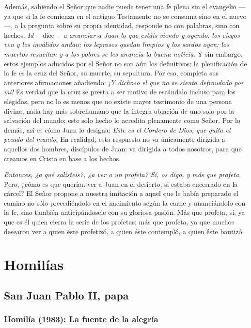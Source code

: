 Además, sabiendo el Señor que nadie puede tener una fe plena sin el evangelio ---ya que si la fe comienza en el antiguo Testamento no se consuma sino en el nuevo---, a la pregunta sobre su propia identidad, responde no con palabras, sino con hechos. \emph{Id} ---dice--- \emph{a anunciar a Juan lo que estáis viendo y oyendo: los ciegos ven y los inválidos andan; los leprosos quedan limpios y los sordos oyen; los muertos resucitan y a los pobres se les anuncia la buena noticia}. Y sin embargo, estos ejemplos aducidos por el Señor no son aún los definitivos: la plenificación de la fe es la cruz del Señor, su muerte, su sepultura. Por eso, completa sus anteriores afirmaciones añadiendo: \emph{¡Y dichoso el que no se sienta defraudado por mí!} Es verdad que la cruz se presta a ser motivo de escándalo incluso para los elegidos, pero no lo es menos que no existe mayor testimonio de una persona divina, nada hay más sobrehumano que la íntegra oblación de uno solo por la salvación del mundo; este solo hecho lo acredita plenamente como Señor. Por lo demás, así es cómo Juan lo designa: \emph{Este es el Cordero de Dios, que quita el pecado del mundo}. En realidad, esta respuesta no va únicamente dirigida a aquellos dos hombres, discípulos de Juan: va dirigida a todos nosotros, para que creamos en Cristo en base a los hechos.

\emph{Entonces, ¿a qué salisteis?, ¿a ver a un profeta? Sí, os digo, y más que profeta}. Pero, ¿cómo es que querían ver a Juan en el desierto, si estaba encerrado en la cárcel? El Señor propone a nuestra imitación a aquel que le había preparado el camino no sólo precediéndolo en el nacimiento según la carne y anunciándolo con la fe, sino también anticipándosele con su gloriosa pasión. Más que profeta, sí, ya que es él quien cierra la serie de los profetas; más que profeta, ya que muchos desearon ver a quien éste profetizó, a quien éste contempló, a quien éste bautizó.

\section{Homilías}

\subsection{San Juan Pablo II, papa}


\subsubsection{Homilía (1983): La fuente de la alegría}

